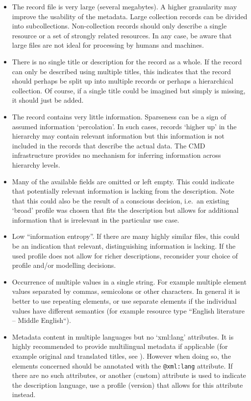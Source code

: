 \begin{itemize}
\tightlist
\item
  The record file is very large (several megabytes). A higher
  granularity may improve the usability of the metadata. Large
  collection records can be divided into subcollections. Non-collection records should only describe a single resource or a set of strongly related resources. In any case, be aware that large files are not ideal for processing by humans and machines.
\item
  There is no single title or description for the record as a whole. If the record can only be described using multiple titles, this indicates that the record should perhaps be split up into multiple records or perhaps a hierarchical collection. Of course, if a single title could be imagined but simply is missing, it should just be added.
\item
  The record contains very little information. Sparseness can be a sign of assumed information `percolation'. In such cases, records `higher up' in the hierarchy may contain relevant information but this information is not included in the records that describe the actual data. The CMD infrastructure provides no mechanism for inferring information across hierarchy levels.
\item
  Many of the available fields are omitted or left empty. This could indicate that potentially relevant information is lacking from the description. Note that this could also be the result of a conscious decision, i.e.~an existing `broad' profile was chosen that fits the description but allows for additional information that is irrelevant in the particular use case.
\item
  Low ``information entropy''. If there are many highly similar files, this could be an indication that relevant, distinguishing information is lacking. If the used profile does not allow for richer descriptions, reconsider your choice of profile and/or modelling decisions.
\item
  Occurrence of multiple values in a single string. For example multiple element values separated by commas, semicolons or other characters. In general it is better to use repeating elements, or use separate elements if the individual values have different semantics (for example resource type ``English literature -- Middle English``).
\item
  Metadata content in multiple languages but no `xml:lang' attributes. It is highly recommended to provide multilingual metadata if applicable (for example original and translated titles, see ). However when doing so, the elements concerned should be annotated with the \texttt{@xml:lang} attribute. If there are no such attributes, or another (custom) attribute is used to indicate the description language, use a profile (version) that allows for this attribute instead.

\end{itemize}
